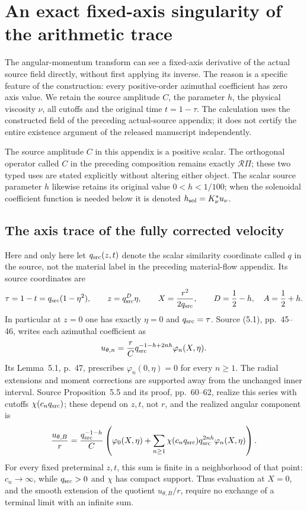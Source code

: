 \section*{An exact fixed-axis singularity of the arithmetic trace}
\label{sec:ns-axis-arithmetic-jet}

The angular-momentum transform can see a fixed-axis derivative of the
actual source field directly, without first applying its inverse. The
reason is a specific feature of the construction: every positive-order
azimuthal coefficient has zero axis value. We retain the source amplitude
\(C\), the parameter \(h\), the physical viscosity \(\nu\), all cutoffs and
the original time \(t=1-\tau\). The calculation uses the constructed
field of the preceding actual-source appendix; it does not certify the
entire existence argument of the released manuscript independently.


The source amplitude \(C\) in this appendix is a positive scalar. The
orthogonal operator called \(C\) in the preceding composition remains
exactly \(\mathcal R\Pi\); these two typed uses are stated explicitly
without altering either object. The scalar source parameter \(h\) likewise
retains its original value \(0<h<1/100\); when the solenoidal coefficient
function is needed below it is denoted \(h_{\rm sol}=K_\nu^*u_\nu\).

\subsection*{The axis trace of the fully corrected velocity}

Here and only here let \(q_{\rm src}(z,t)\) denote the scalar similarity
coordinate called \(q\) in the source, not the material label in
the preceding material-flow appendix. Its source coordinates are
\[
 \tau=1-t=q_{\rm src}(1-\eta^2),\qquad
 z=q_{\rm src}^{D}\eta,\qquad
 X=\frac{r^2}{2q_{\rm src}},\qquad
 D=\frac12-h,\quad A=\frac12+h.
\]
In particular at \(z=0\) one has exactly \(\eta=0\) and
\(q_{\rm src}=\tau\).
Source (5.1), pp.~45--46, writes each azimuthal coefficient as
\[
 u_{\theta,n}
   =\frac rC q_{\rm src}^{-1-h+2nh}\varphi_n(X,\eta).
\]
Its Lemma~5.1, p.~47, prescribes
\(\varphi_n(0,\eta)=0\) for every \(n\ge1\).
The radial extensions and moment corrections are supported away from
the unchanged inner interval. Source Proposition~5.5 and its proof,
pp.~60--62, realize this series with cutoffs \(\chi(c_nq_{\rm src})\);
these depend on \(z,t\), not \(r\), and the realized angular component is
\begin{equation}\label{naj:base-series}
 \frac{u_{\theta,B}}r
 =\frac{q_{\rm src}^{-1-h}}C
 \left(\varphi_0(X,\eta)+
   \sum_{n\ge1}\chi(c_nq_{\rm src})
                       q_{\rm src}^{2nh}\varphi_n(X,\eta)\right).
\end{equation}
For every fixed preterminal \(z,t\), this sum is finite in a neighborhood
of that point: \(c_n\to\infty\), while \(q_{\rm src}>0\) and \(\chi\)
has compact support. Thus evaluation at \(X=0\), and the smooth extension
of the quotient \(u_{\theta,B}/r\), require no exchange of a terminal
limit with an infinite sum.

